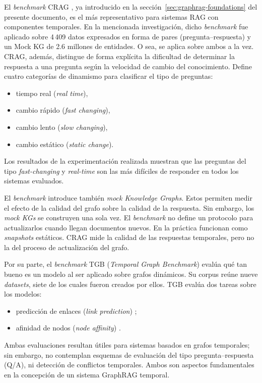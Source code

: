 El \emph{benchmark} CRAG \cite{crag2024}, ya introducido en la sección~\ref{sec:graphrag-foundations} del presente documento, es el más representativo para sistemas RAG con componentes temporales. En la mencionada investigación, dicho \emph{benchmark} fue aplicado sobre 4\,409 datos expresados en forma de pares (pregunta--respuesta) y un Mock KG \cite{mock_kg_placeholder} de 2.6 millones de entidades. O sea, se aplica sobre ambos a la vez. CRAG, además, distingue de forma explícita la dificultad de determinar la respuesta a una pregunta según la velocidad de cambio del conocimiento. Define cuatro categorías de dinamismo para clasificar el tipo de preguntas:
\begin{itemize}
    \item tiempo real (\emph{real time}),
    \item cambio rápido (\emph{fast changing}),
    \item cambio lento (\emph{slow changing}),
    \item cambio estático (\emph{static change}).
\end{itemize}
Los resultados de la experimentación realizada muestran que las preguntas del tipo \emph{fast-changing} y \emph{real-time} son las más difíciles de responder en todos los sistemas evaluados.

El \emph{benchmark} introduce también \emph{mock Knowledge Graphs}. Estos permiten medir el efecto de la calidad del grafo sobre la calidad de la respuesta. Sin embargo, los \emph{mock KGs} se construyen una sola vez. El \emph{benchmark} no define un protocolo para actualizarlos cuando llegan documentos nuevos. En la práctica funcionan como \emph{snapshots} estáticos. CRAG mide la calidad de las respuestas temporales, pero no la del proceso de actualización del grafo.

Por su parte, el \emph{benchmark} TGB (\emph{Temporal Graph Benchmark}) \cite{tgb2023} evalúa qué tan bueno es un modelo al ser aplicado sobre grafos dinámicos. Su corpus reúne nueve \emph{datasets}, siete de los cuales fueron creados por ellos. TGB evalúa dos tareas sobre los modelos:
\begin{itemize}
    \item predicción de enlaces (\emph{link prediction}) \cite{link_prediction_placeholder};
    \item afinidad de nodos (\emph{node affinity}) \cite{node_affinity_placeholder}.
\end{itemize}
Ambas evaluaciones resultan útiles para sistemas basados en grafos temporales; sin embargo, no contemplan esquemas de evaluación del tipo pregunta--respuesta (Q/A), ni detección de conflictos temporales. Ambos son aspectos fundamentales en la concepción de un sistema GraphRAG temporal.


